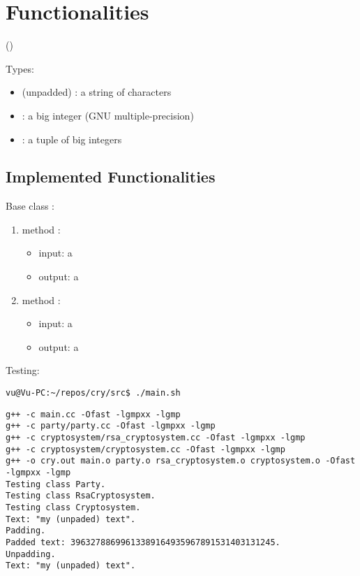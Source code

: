 \section{Functionalities}
(\vp) \bigskip




Types:
\begin{itemize}
\item (unpadded) : a string of characters
\item {}: a big integer (GNU multiple-precision)
\item {}: a tuple of big integers
\end{itemize}


\subsection{Implemented Functionalities}

Base class :
\begin{enumerate}
\item method :
  \begin{itemize}
  \item input: a 
  \item output: a 
  \end{itemize}
\item method :
  \begin{itemize}
  \item input: a 
  \item output: a 
  \end{itemize}
\end{enumerate}

Testing:
\begin{verbatim}
vu@Vu-PC:~/repos/cry/src$ ./main.sh
\end{verbatim}
\begin{lstlisting}
g++ -c main.cc -Ofast -lgmpxx -lgmp
g++ -c party/party.cc -Ofast -lgmpxx -lgmp
g++ -c cryptosystem/rsa_cryptosystem.cc -Ofast -lgmpxx -lgmp
g++ -c cryptosystem/cryptosystem.cc -Ofast -lgmpxx -lgmp
g++ -o cry.out main.o party.o rsa_cryptosystem.o cryptosystem.o -Ofast -lgmpxx -lgmp
Testing class Party.
Testing class RsaCryptosystem.
Testing class Cryptosystem.
Text: "my (unpaded) text".
Padding.
Padded text: 39632788699613389164935967891531403131245.
Unpadding.
Text: "my (unpaded) text".
\end{lstlisting}

